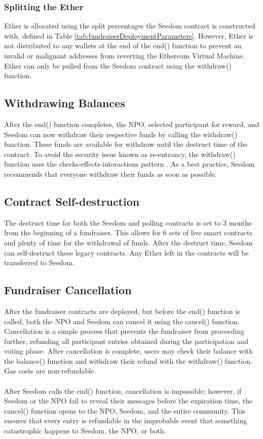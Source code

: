 \documentclass[11pt]{article}
\begin{document}
\subsubsection{Splitting the Ether}

Ether is allocated using the split percentages the Seedom contract is constructed with, defined in Table \ref{tab:fundraiserDeploymentParameters}. However, Ether is not distributed to any wallets at the end of the end() function to prevent an invalid or malignant addresses from reverting the Ethereum Virtual Machine. Ether can only be pulled from the Seedom contract using the withdraw() function.

\subsection{Withdrawing Balances}

After the end() function completes, the NPO, selected participant for reward, and Seedom can now withdraw their respective funds by calling the withdraw() function. These funds are available for withdraw until the destruct time of the contract. To avoid the security issue known as re-entrancy, the withdraw() function uses the checks-effects-interactions pattern \cite{7}. As a best practice, Seedom recommends that everyone withdraw their funds as soon as possible.

\subsection{Contract Self-destruction}
\label{sec:contractSelfDestruction}

The destruct time for both the Seedom and polling contracts is set to 3 months from the beginning of a fundraiser. This allows for 6 sets of live smart contracts and plenty of time for the withdrawal of funds. After the destruct time, Seedom can self-destruct these legacy contracts. Any Ether left in the contracts will be transferred to Seedom.

\subsection{Fundraiser Cancellation}
\label{sec:fundraiserCancellation}

After the fundraiser contracts are deployed, but before the end() function is called, both the NPO and Seedom can cancel it using the cancel() function. Cancellation is a simple process that prevents the fundraiser from proceeding further, refunding all participant entries obtained during the participation and voting phase. After cancellation is complete, users may check their balance with the balance() function and withdraw their refund with the withdraw() function. Gas costs are non-refundable.\\\\
After Seedom calls the end() function, cancellation is impossible; however, if Seedom or the NPO fail to reveal their messages before the expiration time, the cancel() function opens to the NPO, Seedom, and the entire community. This ensures that every entry is refundable in the improbable event that something catastrophic happens to Seedom, the NPO, or both.
\end{document}

